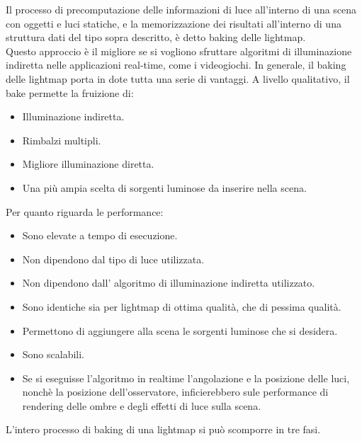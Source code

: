 Il processo di precomputazione delle informazioni di luce all’interno di una scena con oggetti e luci statiche, e la memorizzazione dei risultati all’interno di una struttura dati del tipo sopra descritto, è detto baking delle lightmap. \cite{light6}
\\
Questo approccio è il migliore se si vogliono sfruttare algoritmi di illuminazione indiretta nelle applicazioni real-time, come i videogiochi. In generale, il baking delle lightmap porta in dote tutta una serie di vantaggi.
A livello qualitativo, il bake permette la fruizione di:
\begin{itemize}
\item Illuminazione indiretta.
\item Rimbalzi multipli.
\item Migliore illuminazione diretta.
\item Una più ampia scelta di sorgenti luminose da inserire nella scena.
\end{itemize}
Per quanto riguarda le performance:
\begin{itemize}
\item Sono elevate a tempo di esecuzione.
\item Non dipendono dal tipo di luce utilizzata.
\item Non dipendono dall’ algoritmo di illuminazione indiretta utilizzato.
\item Sono identiche sia per lightmap di ottima qualità, che di pessima qualità.
\item Permettono di aggiungere alla scena le sorgenti luminose che si desidera.
\item Sono scalabili.
\item Se si eseguisse l’algoritmo in realtime l’angolazione e la posizione delle luci, nonchè la posizione dell’osservatore, inficierebbero sule performance di rendering delle ombre e degli effetti di luce sulla scena.
\end{itemize}
L’intero processo di baking di una lightmap si può scomporre in tre fasi.
\\

